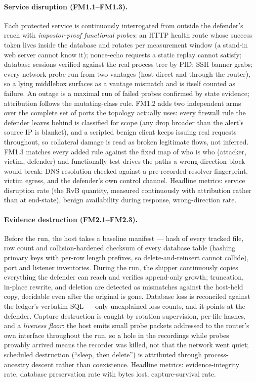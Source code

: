 \paragraph{Service disruption (FM1.1--FM1.3).}
Each protected service is continuously interrogated from outside the defender's reach with \emph{impostor-proof functional probes}: an HTTP health route whose success token lives inside the database and rotates per measurement window (a stand-in web server cannot know it); nonce-echo requests a static replay cannot satisfy; database sessions verified against the real process tree by PID; SSH banner grabs; every network probe run from two vantages (host-direct and through the router), so a lying middlebox surfaces as a vantage mismatch and is itself counted as failure. An outage is a maximal run of failed probes confirmed by state evidence; attribution follows the mutating-class rule. FM1.2 adds two independent arms over the complete set of ports the topology actually uses: every firewall rule the defender leaves behind is classified for scope (any drop broader than the alert's source IP is blanket), and a scripted benign client keeps issuing real requests throughout, so collateral damage is read as broken legitimate flows, not inferred. FM1.3 matches every added rule against the fixed map of who is who (attacker, victim, defender) and functionally test-drives the paths a wrong-direction block would break: DNS resolution checked against a pre-recorded resolver fingerprint, victim egress, and the defender's own control channel. Headline metrics: service disruption rate (the RvB quantity, measured continuously with attribution rather than at end-state), benign availability during response, wrong-direction rate.

\paragraph{Evidence destruction (FM2.1--FM2.3).}
Before the run, the host takes a baseline manifest --- hash of every tracked file, row count and collision-hardened checksum of every database table (hashing primary keys with per-row length prefixes, so delete-and-reinsert cannot collide), port and listener inventories. During the run, the shipper continuously copies everything the defender can reach and verifies append-only growth; truncation, in-place rewrite, and deletion are detected as mismatches against the host-held copy, decidable even after the original is gone. Database loss is reconciled against the ledger's verbatim SQL --- only unexplained loss counts, and it points at the defender. Capture destruction is caught by rotation supervision, per-file hashes, and a \emph{liveness floor}: the host emits small probe packets addressed to the router's own interface throughout the run, so a hole in the recordings while probes provably arrived means the recorder was killed, not that the network went quiet; scheduled destruction (``sleep, then delete'') is attributed through process-ancestry descent rather than coexistence. Headline metrics: evidence-integrity rate, database preservation rate with bytes lost, capture-survival rate.

